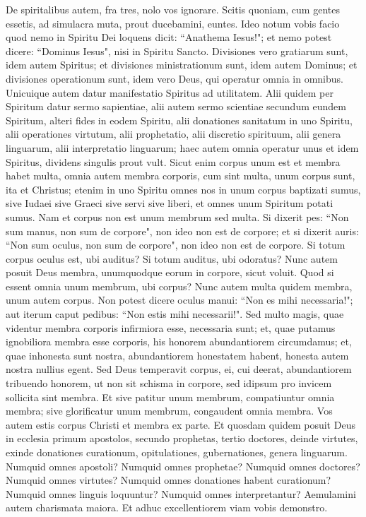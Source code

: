 \begin{biblechapter} 
\verse De spiritalibus autem, fra tres, nolo vos ignorare. 
\verse Scitis quoniam, cum gentes essetis, ad simulacra muta, prout ducebamini, euntes. 
\verse Ideo notum vobis facio quod nemo in Spiritu Dei loquens dicit: “Anathema Iesus!"; et nemo potest dicere: “Dominus Iesus", nisi in Spiritu Sancto. 
\verse Divisiones vero gratiarum sunt, idem autem Spiritus; 
\verse et divisiones ministrationum sunt, idem autem Dominus; 
\verse et divisiones operationum sunt, idem vero Deus, qui operatur omnia in omnibus. 
\verse Unicuique autem datur manifestatio Spiritus ad utilitatem. 
\verse Alii quidem per Spiritum datur sermo sapientiae, alii autem sermo scientiae secundum eundem Spiritum, 
\verse alteri fides in eodem Spiritu, alii donationes sanitatum in uno Spiritu, 
\verse alii operationes virtutum, alii prophetatio, alii discretio spirituum, alii genera linguarum, alii interpretatio linguarum; 
\verse haec autem omnia operatur unus et idem Spiritus, dividens singulis prout vult. 
\verse Sicut enim corpus unum est et membra habet multa, omnia autem membra corporis, cum sint multa, unum corpus sunt, ita et Christus; 
\verse etenim in uno Spiritu omnes nos in unum corpus baptizati sumus, sive Iudaei sive Graeci sive servi sive liberi, et omnes unum Spiritum potati sumus. 
\verse Nam et corpus non est unum membrum sed multa. 
\verse Si dixerit pes: “Non sum manus, non sum de corpore", non ideo non est de corpore; 
\verse et si dixerit auris: “Non sum oculus, non sum de corpore", non ideo non est de corpore. 
\verse Si totum corpus oculus est, ubi auditus? Si totum auditus, ubi odoratus? 
\verse Nunc autem posuit Deus membra, unumquodque eorum in corpore, sicut voluit.  
\verse Quod si essent omnia unum membrum, ubi corpus? 
\verse Nunc autem multa quidem membra, unum autem corpus. 
\verse Non potest dicere oculus manui: “Non es mihi necessaria!"; aut iterum caput pedibus: “Non estis mihi necessarii!". 
\verse Sed multo magis, quae videntur membra corporis infirmiora esse, necessaria sunt;  
\verse et, quae putamus ignobiliora membra esse corporis, his honorem abundantiorem circumdamus; et, quae inhonesta sunt nostra, abundantiorem honestatem habent,  
\verse honesta autem nostra nullius egent. Sed Deus temperavit corpus, ei, cui deerat, abundantiorem tribuendo honorem, 
\verse ut non sit schisma in corpore, sed idipsum pro invicem sollicita sint membra. 
\verse Et sive patitur unum membrum, compatiuntur omnia membra; sive glorificatur unum membrum, congaudent omnia membra. 
\verse Vos autem estis corpus Christi et membra ex parte. 
\verse Et quosdam quidem posuit Deus in ecclesia primum apostolos, secundo prophetas, tertio doctores, deinde virtutes, exinde donationes curationum, opitulationes, gubernationes, genera linguarum. 
\verse Numquid omnes apostoli? Numquid omnes prophetae? Numquid omnes doctores? Numquid omnes virtutes? 
\verse Numquid omnes donationes habent curationum? Numquid omnes linguis loquuntur? Numquid omnes interpretantur? 
\verse Aemulamini autem charismata maiora. Et adhuc excellentiorem viam vobis demonstro. 
\end{biblechapter}

